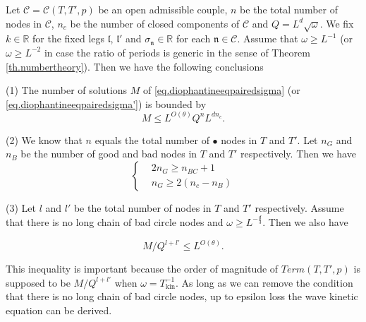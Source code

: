 \begin{prop}\label{prop.counting}
Let $\mathcal{C}=\mathcal{C}(T,T',p)$ be an open admissible couple, $n$ be the total number of nodes in $\mathcal{C}$, $n_c$ be the number of closed components of $\mathcal{C}$ and $Q=L^{d}\sqrt{\omega}$. We fix $k\in \mathbb{R}$ for the fixed legs $\mathfrak{l}$, $\mathfrak{l}'$ and $\sigma_{\mathfrak{n}}\in\mathbb{R}$ for each $\mathfrak{n}\in \mathcal{C}$. Assume that $\omega\ge L^{-1}$ (or $\omega\ge L^{-2}$ in case the ratio of periods is generic in the sense of Theorem \ref{th.numbertheory}). Then we have the following conclusions

(1) The number of solutions $M$ of \eqref{eq.diophantineeqpairedsigma} (or \eqref{eq.diophantineeqpairedsigma'}) is bounded by 
\begin{equation}\label{eq.countingbd0}
    M\leq L^{O(\theta)} Q^{n} L^{dn_c}.
\end{equation}

(2) We know that $n$ equals the total number of $\bullet$ nodes in $T$ and $T'$. Let $n_G$ and $n_B$ be the number of good and bad nodes in $T$ and $T'$ respectively. Then we have 
\begin{equation}\label{eq.ineqn_Gn_B}
    \left\{\begin{aligned}
        & 2n_G \ge n_{BC}+1
        \\
        & n_G \ge 2(n_c - n_B)
    \end{aligned}\right.
\end{equation}




(3) Let $l$ and $l'$ be the total number of nodes in $T$ and $T'$ respectively. Assume that there is no long chain of bad circle nodes and $\omega \ge L^{-\frac{d}{3}}$. Then we also have 

\begin{equation}\label{eq.countingbd1}
    M/Q^{l+l'}\leq L^{O(\theta)}. 
\end{equation}

This inequality is important because the order of magnitude of $Term(T,T',p)$ is supposed to be  $M/Q^{l+l'}$ when $\omega=T_{\text{kin}}^{-1}$. As long as we can remove the condition that there is no long chain of bad circle nodes, up to epsilon loss the wave kinetic equation can be derived.

\end{prop}
